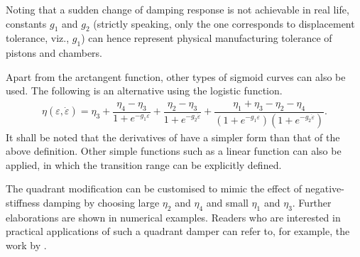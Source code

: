 Noting that a sudden change of damping response is not achievable in real life, constants $g_1$ and $g_2$ (strictly speaking, only the one corresponds to displacement tolerance, viz., $g_1$) can hence represent physical manufacturing tolerance of pistons and chambers.

Apart from the arctangent function, other types of sigmoid curves can also be used. The following is an alternative using the logistic function.
\begin{gather}
\eta\left(\varepsilon,\dot\varepsilon\right)=\eta_3+\dfrac{\eta_4-\eta_3}{1+e^{-g_1\varepsilon}}+\dfrac{\eta_2-\eta_3}{1+e^{-g_2\dot{\varepsilon}}}+\dfrac{\eta_1+\eta_3-\eta_2-\eta_4}{\left(1+e^{-g_1\varepsilon}\right)\left(1+e^{-g_2\dot{\varepsilon}}\right)}.
\end{gather}
It shall be noted that the derivatives of  have a simpler form than that of the above definition. Other simple functions such as a linear function can also be applied, in which the transition range can be explicitly defined.

The quadrant modification can be customised to mimic the effect of negative-stiffness damping \cite{Iemura2009,Hoegsberg2011,Zhou2015,Javanbakht2018} by choosing large $\eta_2$ and $\eta_4$ and small $\eta_1$ and $\eta_3$. Further elaborations are shown in numerical examples. Readers who are interested in practical applications of such a quadrant damper can refer to, for example, the work by \cite{Hazaveh2017}.
